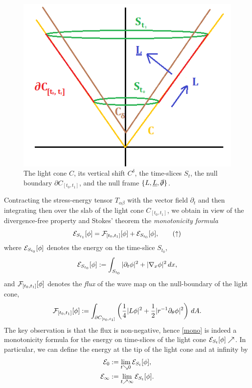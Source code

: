 	
	\begin{figure}[h]
		\begin{center}
			\includegraphics{graphics/cone}
			\caption{The light cone $C$, its vertical shift $C^\delta$, the time-slices $S_{t}$, the null boundary $\partial C_{[t_0, t_1]}$, and the null frame $\{L, \underline L, \slashed\partial\}$. }
		\end{center}	
	\end{figure}	
Contracting the stress-energy tensor $T_{\alpha \beta}$ with the vector field $\partial_t$ and then integrating then over the slab of the light cone $C_{[t_0, t_1]}$, we obtain in view of the divergence-free property and Stokes' theorem the  \emph{monotonicity formula}
	\begin{equation}
		\mathcal E_{S_{t_1}} [\phi] = \mathcal F_{[t_0, t_1]} [\phi] + \mathcal E_{S_{t_0}} [\phi],
		\label{eq:mono}
		\tag{$\uparrow$}
	\end{equation}	
where $\mathcal E_{S_{t_0}} [\phi]$ denotes the energy on the time-slice $S_{t_0}$, 
	\[ \mathcal E_{S_{t_0}} [\phi] := \int_{S_{t_0}} |\partial_t \phi|^2 + |\nabla_x \phi|^2 \, dx ,\]
and $\mathcal F_{[t_0, t_1]} [\phi]$ denotes the \emph{flux} of the wave map on the null-boundary of the light cone,
	\[
		\mathcal F_{[t_0, t_1]} [\phi] := \int_{\partial C_{[t_0, t_1]}} \left( \frac14 |L \phi|^2 + \frac12 |r^{-1} \partial_\theta \phi|^2 \right) \, dA.
	\]
The key observation is that the flux is non-negative, hence \eqref{mono} is indeed a monotonicity formula for the energy on time-slices of the light cone $\mathcal E_{S_t} [\phi] \nearrow$. In particular, we can define the energy at the tip of the light cone and at infinity by 
	\begin{align*}		
		\mathcal E_0 
			&:= \lim_{t \searrow 0} \mathcal E_{S_t} [\phi], \\
		\mathcal E_\infty 
			&:= \lim_{t \nearrow \infty} \mathcal E_{S_t} [\phi]. 
	\end{align*}


